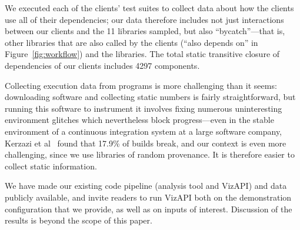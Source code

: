 We executed each of the clients' test suites to collect data about how the clients use all of their dependencies; our data therefore includes not just interactions between our clients and the 11 libraries sampled, but also ``bycatch''---that is, other libraries that are also called by the clients (``also depends on'' in Figure~\ref{fig:workflow}) and the libraries. The total static transitive closure of dependencies of our clients includes 4297 components.

Collecting execution data from programs is more challenging than it seems: downloading software and collecting static numbers is fairly straightforward, but running this software to instrument it involves fixing numerous uninteresting environment glitches which nevertheless block progress---even in the stable environment of a continuous integration system at a large software company, Kerzazi et al~\cite{kerzazi14:_why_do_autom_build_break} found that 17.9\% of builds break, and our context is even more challenging, since we use libraries of random provenance. It is therefore easier to collect static information.

We have made our existing code pipeline (analysis tool and VizAPI) and data publicly available, and invite readers to run VizAPI both on the demonstration configuration that we provide, as well as on inputs of interest. Discussion of the results is beyond the scope of this paper.
